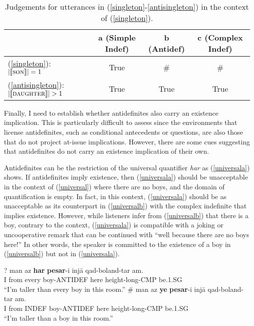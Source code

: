 \documentclass{salt}
\begin{document}
\begin {table}
\centering
{\small
\begin {tabular} {l | c c c}
 & a {\scriptsize(Simple Indef)} & b {\scriptsize(Antidef)} & c {\scriptsize(Complex Indef)}  \\ \hline
(\ref {singleton}): {\small $| \llbracket \textsc{son} \rrbracket | = 1$} & True & \# & \# \\
(\ref {antisingleton}): {\small $| \llbracket \textsc{daughter} \rrbracket | > 1$} & True & True & True \\
\end {tabular}
}
\caption {{\footnotesize Judgements for utterances in (\ref{singleton}-\ref{antisingleton}) in the context of (\ref{singleton}). }}
\label{judge2}
\end {table}

Finally, I need to establish whether antidefinites also carry an existence implication. This is particularly difficult to assess since the environments that license antidefinites, such as conditional antecedents or questions, are also those that do not project at-issue implications. However, there are some cues suggesting that antidefinites do not carry an existence implication of their own. 

Antidefinites can be the restriction of the universal quantifier \emph{har} as (\ref{universala}) shows. If antidefinites imply existence, then (\ref{universala}) should be unacceptable in the context of (\ref{universal}) where there are no boys, and the domain of quantification is empty. In fact, in this context, (\ref{universala}) should be as unacceptable as its counterpart in (\ref{universalb}) with the complex indefinite that implies existence. However, while listeners infer from (\ref{universalb}) that there is a boy, contrary to the context, (\ref{universala}) is compatible with a joking or uncooperative remark that can be continued with ``well because there are no boys here!'' In other words, the speaker is committed to the existence of a boy in (\ref{universalb}) but not in (\ref{universala}).
 
	\begin {exe}
	  \label {universal}
		\begin {xlist}
		\ex \label {universala}
		\gll	?	man		az		\textbf{har} \textbf{pesar}-{\color {blue}i}	inj\={a}	qad-boland-tar	am.\\
			{}	I		from 	every		boy-{\scriptsize ANTIDEF}	here		height-long-{\scriptsize CMP}	be.{\scriptsize 1.SG} \\
			``I'm taller than every boy in this room.''
		\ex \label {universalb}
		\gll	\# man		az		{\color {red}\textbf{ye}} \textbf{pesar}-{\color {blue}i}	inj\={a}	qad-boland-tar	am.\\
			{}	I		from 	{\scriptsize INDEF}		boy-{\scriptsize ANTIDEF}	here		height-long-{\scriptsize CMP}	be.{\scriptsize 1.SG} \\
			``I'm taller than a boy in this room.''
		\end {xlist}
	\end {exe}
\end{document}
